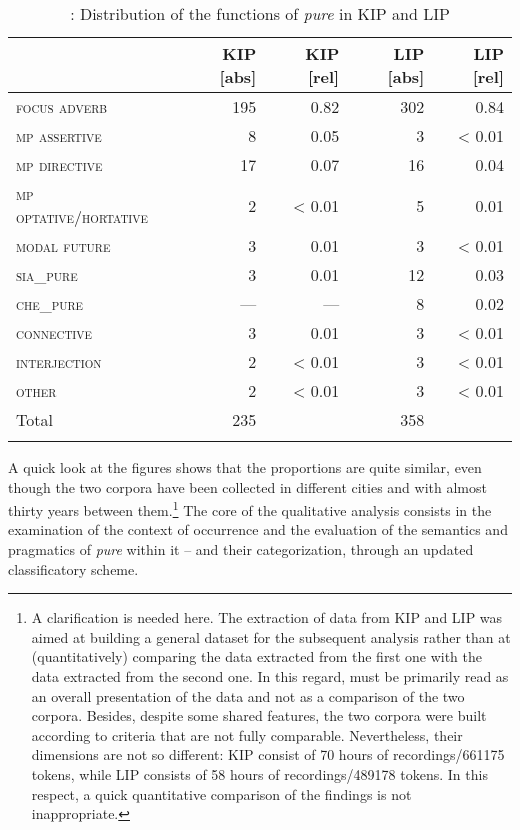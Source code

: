 \begin{table}
\begin{tabularx}{\textwidth}{Xrrrr}
\lsptoprule
 & KIP [abs] & KIP [rel] & LIP [abs] & LIP [rel]\\
 \midrule
\textsc{focus} \textsc{adverb} & 195 & {0.82} & 302 & {0.84}\\
\textsc{mp} \textsc{assertive} & 8 & {0.05} & 3 & {< 0.01}\\
\textsc{mp} \textsc{directive} & 17 & {0.07} & 16 & {0.04}\\
\textsc{mp} \textsc{optative/hortative}  & 2 & {< 0.01} & 5 & {0.01}\\
\textsc{modal} \textsc{future} & 3 & {0.01} & 3 & {< 0.01}\\
\textsc{sia\_pure} & 3 & {0.01} & 12 & {0.03}\\
\textsc{che\_pure} & — & — & 8 & {0.02}\\
\textsc{connective} & 3 & {0.01} & 3 & {< 0.01}\\
\textsc{interjection} & 2 & {< 0.01} & 3 & {< 0.01}\\
\textsc{other} & 2 & {< 0.01} & 3 & {< 0.01}\\
\midrule
Total & 235 &  & 358 & \\
\lspbottomrule
\end{tabularx}
\caption{\label{tab:key:6.1}: Distribution of the functions of \textit{pure} in KIP and LIP}
\end{table}

A quick look at the figures shows that the proportions are quite similar, even though the two corpora have been collected in different cities and with almost thirty years between them.\footnote{A clarification is needed here. The extraction of data from KIP and LIP was aimed at building a general dataset for the subsequent analysis rather than at (quantitatively) comparing the data extracted from the first one with the data extracted from the second one. In this regard,  must be primarily read as an overall presentation of the data and not as a comparison of the two corpora. Besides, despite some shared features, the two corpora were built according to criteria that are not fully comparable. Nevertheless, their dimensions are not so different: KIP consist of 70 hours of recordings/661175 tokens, while LIP consists of 58 hours of recordings/489178 tokens. In this respect, a quick quantitative comparison of the findings is not inappropriate.} The core of the qualitative analysis consists in the examination of the context of occurrence and the evaluation of the semantics and pragmatics of \textit{pure} within it – and their categorization, through an updated classificatory scheme.

